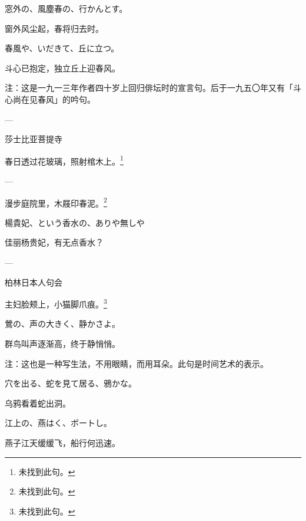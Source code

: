 \begin{haiku}
    {\FH 窓外の、風塵春の、行かんとす。}

    {\FK 窗外风尘起，春将归去时。}
\end{haiku}

\begin{haiku}
    {\FH 春風や、いだきて、丘に立つ。}

    {\FK 斗心已抱定，独立丘上迎春风。}

    {\FT 注：这是一九一三年作者四十岁上回归俳坛时的宣言句。后于一九五〇年又有「斗心尚在见春风」的吟句。}
\end{haiku}

\begin{haiku}
    {\FH ---}

    {\FK 莎士比亚菩提寺}

    {\FK 春日透过花玻璃，照射棺木上。\footnote{\FT 未找到此句。}}
\end{haiku}

\begin{haiku}
    {\FH ---}

    {\FK 漫步庭院里，木屐印春泥。\footnote{\FT 未找到此句。}}
\end{haiku}

\begin{haiku}
    {\FH 楊貴妃、という香水の、ありや無しや}

    {\FK 佳丽杨贵妃，有无点香水？}
\end{haiku}

\begin{haiku}
    {\FH ---}

    {\FK 柏林日本人句会}

    {\FK 主妇脸颊上，小猫脚爪痕。\footnote{\FT 未找到此句。}}
\end{haiku}

\begin{haiku}
    {\FH 鶯の、声の大きく、静かさよ。}

    {\FK 群鸟叫声逐渐高，终于静悄悄。}

    {\FT 注：这也是一种写生法，不用眼睛，而用耳朵。此句是时间艺术的表示。}
\end{haiku}

\begin{haiku}
    {\FH 穴を出る、蛇を見て居る、鴉かな。}

    {\FK 乌鸦看着蛇出洞。}
\end{haiku}

\begin{haiku}
    {\FH 江上の、燕はく、ボートし。}

    {\FK 燕子江天缓缓飞，船行何迅速。}
\end{haiku}

